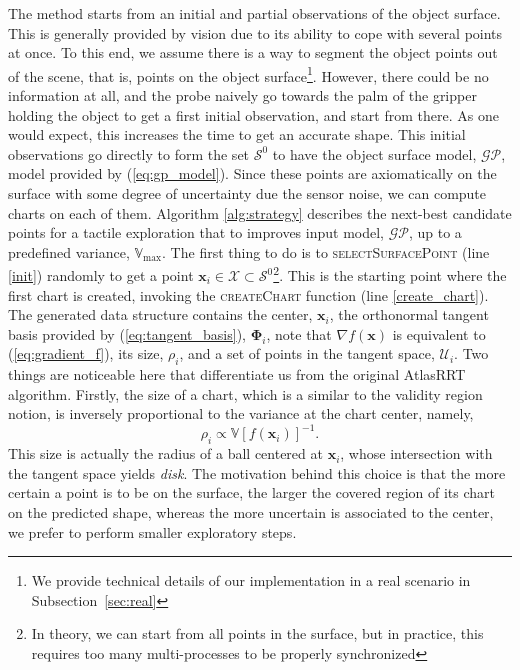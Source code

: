The method starts from an initial and partial observations of the object surface. This is generally provided by vision due to its ability to cope with several points at once. To this end, we assume there is a way to segment the object points out of the scene, that is, points on the object surface\footnote{We provide technical details of our implementation in a real scenario in Subsection~\ref{sec:real}}. However, there could be no information at all, and the probe naively go towards the palm of the gripper holding the object to get a first initial observation, and start from there. As one would expect, this increases the time to get an accurate shape. This initial observations go directly to form the set $\mathcal{S}^0$ to have the object surface model, $\mathcal{GP}$, model provided by (\ref{eq:gp_model}). Since these points are axiomatically on the surface with some degree of uncertainty due the sensor noise, we can compute charts on each of them.
Algorithm \ref{alg:strategy} describes the next-best candidate points for a tactile exploration that to improves input model, $\mathcal{GP}$, up to a predefined variance, $\mathbb{V}_{\max}$. 
The first thing to do is to \textsc{selectSurfacePoint} (line \ref{init}) randomly to get a point $\mathbf{x}_i \in \mathcal{X} \subset \mathcal{S}^0$\footnote{In theory, we can start from all points in the surface, but in practice, this requires too many multi-processes to be properly synchronized}. This is the starting point where the first chart is created, invoking the \textsc{createChart} function (line \ref{create_chart}). The generated data structure contains the center, $\mathbf{x}_i$, the orthonormal tangent basis provided by (\ref{eq:tangent_basis}), $\boldsymbol{\Phi}_i$, note that $\nabla f(\mathbf{x})$ is equivalent to (\ref{eq:gradient_f}), its size, $\rho_i$, and a set of points in the tangent space, $\mathcal{U}_i$. Two things are noticeable here that differentiate us from the original AtlasRRT algorithm. Firstly, the size of a chart, which is a similar to the validity region notion, is inversely proportional to the variance at the chart center, namely,
\begin{equation}
\rho_i \propto \mathbb{V}[f(\mathbf{x}_i)]^{-1}.
\end{equation}
This size is actually the radius of a ball centered at $\mathbf{x}_i$, whose intersection with the tangent space yields \emph{disk}. The motivation behind this choice is that the more certain a point is to be on the surface, the larger the covered region of its chart on the predicted shape, whereas the more uncertain is associated to the center, we prefer to perform smaller exploratory steps.
